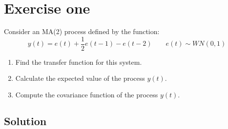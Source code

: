 \section{Exercise one}

Consider an MA(2) process defined by the function:
\[y(t)=e(t)+\dfrac{1}{2}e(t-1)-e(t-2) \qquad e(t)\sim WN(0,1)\]
\begin{enumerate}
    \item Find the transfer function for this system.
    \item Calculate the expected value of the process $y(t)$. 
    \item Compute the covariance function of the process $y(t)$. 
\end{enumerate}

\subsection*{Solution}
